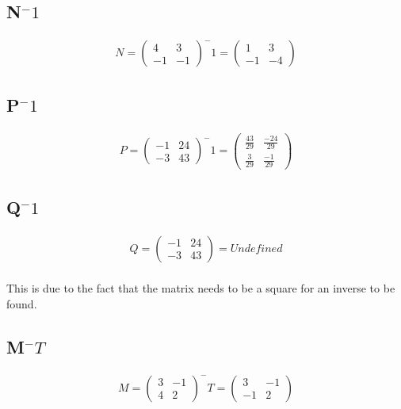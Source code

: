 \documentclass[a4paper,10pt]{article}
\begin{document}
        \subsection{N$^-1$}
            \begin{align*}
              N =
              \begin{pmatrix}
                4 &  3\\
               -1 & -1
              \end{pmatrix}
              ^-1
              =
              \begin{pmatrix}
                1 &  3\\
               -1 & -4
              \end{pmatrix}
            \end{align*}


        \subsection{P$^-1$}
          \begin{align*}
            P =
            \begin{pmatrix}
              -1 & 24\\
              -3 & 43
            \end{pmatrix}
            ^-1
             =
            \begin{pmatrix}
              \frac{43}{29} & \frac{-24}{29}\\
              \frac{ 3}{29} & \frac{ -1}{29}
            \end{pmatrix}
          \end{align*}

        \subsection{Q$^-1$}
          \begin{align*}
            Q =
            \begin{pmatrix}
              -1 & 24\\
              -3 & 43
            \end{pmatrix}
            = Undefined
          \end{align*}
          \\
          This is due to the fact that the matrix needs to be a square for an inverse to be found.

        \subsection{M$^-T$}
          \begin{align*}
            M =
            \begin{pmatrix}
              3 & -1\\
              4 &  2
            \end{pmatrix}
            ^-T
             =
            \begin{pmatrix}
               3 & -1\\
              -1 &  2
            \end{pmatrix}
          \end{align*}
\end{document}
